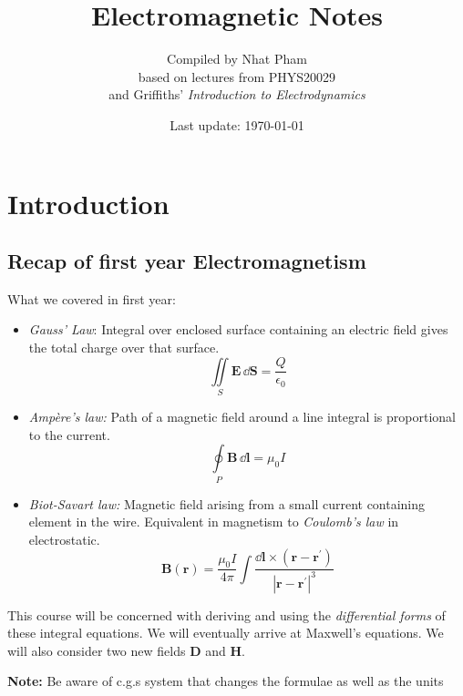 \documentclass[12pt,chapterprefix=false,dvipsnames]{scrbook}
\title{Electromagnetic Notes}
\author{Compiled by Nhat Pham\\ based on lectures from PHYS20029 \\and
	Griffiths' \textit{Introduction to Electrodynamics} } \date{Last update: \today}
\theoremstyle{dotless}
\theoremstyle{definition}
\begin{document}
\maketitle

\tableofcontents

\chapter{Introduction}%
\label{cha:introduction}

\section{Recap of first year Electromagnetism}%
\label{sec:recap_of_first_year_electromagnetism}%

What we covered in first year:

\begin{itemize}
	\item \textit{Gauss' Law}: Integral over enclosed
	      surface containing an electric field gives the total charge over
	      that surface.
	      \begin{equation}
		      \iint\limits_{S}\bm{E}\,\dd{\bm{S}}
		      = \frac{Q}{\epsilon_{0}}
	      \end{equation}
	\item \textit{Ampère's law:} Path of a magnetic
	      field around a line integral is proportional to the current.
	      \begin{equation}
		      \oint\limits_{P}\bm{B}\,\dd{\bm{l}}
		      = \mu_{0}I
	      \end{equation}
	\item \textit{Biot-Savart law:}
	      Magnetic field arising from a small current containing element
	      in the wire. Equivalent in magnetism to \textit{Coulomb's law}
	      in electrostatic.
	      \begin{equation}
		      \bm{B}\left(\bm{r}\right) =
		      \frac{\mu_{0}I}{4\pi}\int\frac{\dd{\bm{l}}\times\left(\bm{r}-\bm{r^\prime}\right)}{\left|\bm{r}-\bm{r^\prime}\right|^3}
	      \end{equation}
\end{itemize}

This course will be concerned with deriving and using the
\textit{differential forms} of these integral equations. We will
eventually arrive at Maxwell's equations. We will also consider
two new fields $\bm{D}$ and
$\bm{H}$.

\textbf{Note:} Be aware of c.g.s system that changes
the formulae as well as the units
\end{document}
